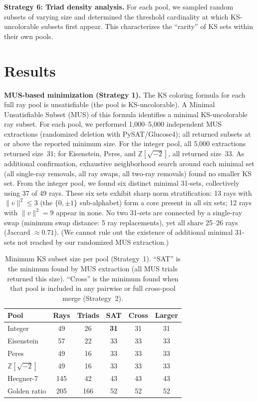 \documentclass[twocolumn,prl,superscriptaddress,nofootinbib]{revtex4-2}
\newcommand{\Z}{\mathbb{Z}}
\begin{document}
\textbf{Strategy 6: Triad density analysis.} For each pool, we sampled random subsets of varying size and determined the threshold cardinality at which KS-uncolorable subsets first appear. This characterizes the ``rarity'' of KS sets within their own pools.

\section{Results}

\textbf{MUS-based minimization (Strategy 1).} The KS coloring formula for each full ray pool is unsatisfiable (the pool is KS-uncolorable).  A Minimal Unsatisfiable Subset (MUS) of this formula identifies a minimal KS-uncolorable ray subset.  For each pool, we performed 1{,}000--5{,}000 independent MUS extractions (randomized deletion with PySAT/Glucose4); all returned subsets at or above the reported minimum size.  For the integer pool, all 5{,}000 extractions returned size~31; for Eisenstein, Peres, and $\Z[\sqrt{-2}]$, all returned size~33.  As additional confirmation, exhaustive neighborhood search around each minimal set (all single-ray removals, all ray swaps, all two-ray removals) found no smaller KS set.  From the integer pool, we found six distinct minimal 31-sets, collectively using 37 of 49 rays.  These six sets exhibit sharp norm stratification: 13 rays with $\|v\|^2 \leq 3$ (the $\{0, \pm 1\}$ sub-alphabet) form a core present in all six sets; 12 rays with $\|v\|^2 = 9$ appear in none.  No two 31-sets are connected by a single-ray swap (minimum swap distance: 5 ray replacements), yet all share 25--26 rays (Jaccard $\approx 0.71$).  (We cannot rule out the existence of additional minimal 31-sets not reached by our randomized MUS extraction.)

\begin{table}[t]
\centering
\caption{Minimum KS subset size per pool (Strategy~1). ``SAT'' is the minimum found by MUS extraction (all MUS trials returned this size). ``Cross'' is the minimum found when that pool is included in any pairwise or full cross-pool merge (Strategy~2).}
\label{tab:results}
\begin{tabular}{lccccc}
\toprule
Pool & Rays & Triads & SAT & Cross & Larger \\
\midrule
Integer & 49 & 26 & \textbf{31} & 31 & 31 \\
Eisenstein & 57 & 22 & 33 & 33 & 33 \\
Peres & 49 & 16 & 33 & 33 & 33 \\
$\Z[\sqrt{-2}]$ & 49 & 16 & 33 & 33 & 33 \\
Heegner-7 & 145 & 42 & 43 & 43 & 43 \\
Golden ratio & 205 & 166 & 52 & 52 & 52 \\
\bottomrule
\end{tabular}
\end{table}
\end{document}
